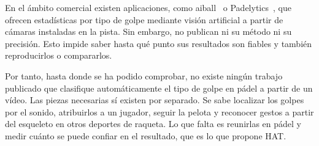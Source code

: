 En el ámbito comercial existen aplicaciones, como aiball~\cite{aiball} o Padelytics~\cite{padelytics}, que ofrecen estadísticas por tipo de golpe mediante visión artificial a partir de cámaras instaladas en la pista.
Sin embargo, no publican ni su método ni su precisión.
Esto impide saber hasta qué punto sus resultados son fiables y también reproducirlos o compararlos.

Por tanto, hasta donde se ha podido comprobar, no existe ningún trabajo publicado que clasifique automáticamente el tipo de golpe en pádel a partir de un vídeo.
Las piezas necesarias sí existen por separado.
Se sabe localizar los golpes por el sonido, atribuirlos a un jugador, seguir la pelota y reconocer gestos a partir del esqueleto en otros deportes de raqueta.
Lo que falta es reunirlas en pádel y medir cuánto se puede confiar en el resultado, que es lo que propone HAT.
